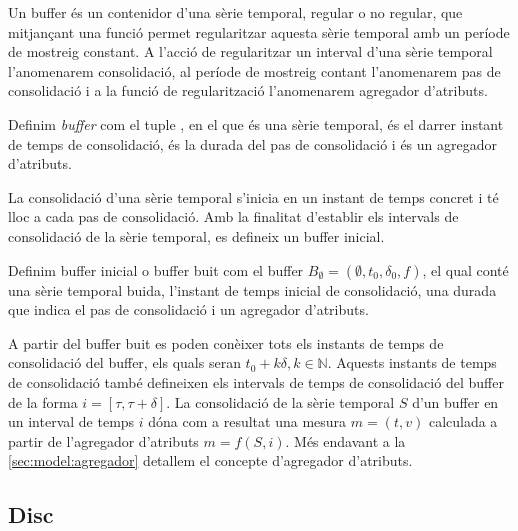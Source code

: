 Un buffer és un contenidor d'una sèrie temporal, regular o no regular, que mitjançant una funció permet regularitzar aquesta sèrie temporal amb un període de mostreig constant. A l'acció de regularitzar un interval d'una sèrie temporal l'anomenarem consolidació, al període de mostreig contant l'anomenarem pas de consolidació i a la funció de regularització l'anomenarem agregador d'atributs.

\begin{definition}[Buffer]
  Definim \emph{buffer} com el tuple
  , en el que
   és una sèrie temporal,
   és el darrer instant de temps de
  consolidació,  és la durada
  del pas de consolidació i  és un
  agregador d'atributs.
\end{definition}

La consolidació d'una sèrie temporal s'inicia en un instant de temps
concret i té lloc a cada pas de consolidació. Amb la finalitat
d'establir els intervals de consolidació de la sèrie temporal, es
defineix un buffer inicial.

\begin{definition}\label{def:model:buffer_buit}
  Definim buffer inicial o buffer buit com el buffer $B_{\emptyset} =
  (\emptyset,t_0, \delta_0, f)$, el qual
  conté una sèrie temporal buida, l'instant de temps inicial de
  consolidació, una durada que indica el pas de consolidació i un
  agregador d'atributs.
\end{definition}

A partir del buffer buit es poden conèixer tots els instants de temps
de consolidació del buffer, els quals seran $t_0+k\delta,
k\in\mathbb{N}$. Aquests instants de temps de consolidació també
defineixen els intervals de temps de consolidació del buffer de la
forma $i=[\tau,\tau+\delta]$. La consolidació de la sèrie temporal $S$
d'un buffer en un interval de temps $i$ dóna com a resultat una mesura
$m=(t,v)$ calculada a partir de l'agregador d'atributs $m = f (S,
i)$. Més endavant a la \autoref{sec:model:agregador} detallem el
concepte d'agregador d'atributs.








\subsection{Disc}\label{sec:model:disc}

